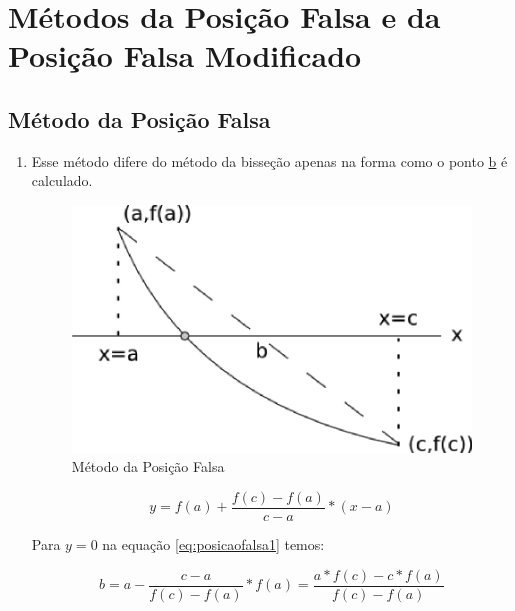 \section{Métodos da Posição Falsa e da Posição Falsa Modificado}

\subsection{Método da Posição Falsa}

\begin{enumerate}
 \item Esse método difere do método da bisseção apenas na forma como o ponto \underline{b} é calculado.

\begin{figure}[htb]
  \setlength{\abovecaptionskip}{20pt}
  \centering
  \includegraphics[scale=0.8]{capitulos/capitulo1/figuras/posicaofalsa1.eps}
  \caption{Método da Posição Falsa}
  \label{fig:posicaofalsa1}
\end{figure}

\begin{equation}
 \label{eq:posicaofalsa1}
 y = f(a) + \frac{f(c) - f(a)}{c - a} \ast (x - a)
\end{equation}

Para $y = 0$ na equação \ref{eq:posicaofalsa1} temos:

\[ \displaystyle b = a - \frac{c - a}{f(c) - f(a)} \ast f(a) = \frac{a \ast f(c) - c \ast f(a)}{f(c) - f(a)} \]


\end{enumerate}
